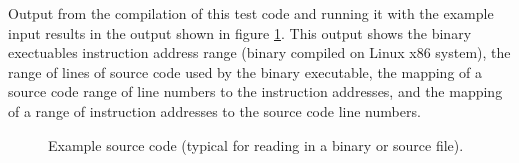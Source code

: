 Output from the compilation of this test code and running it with the example input
results in the output shown in figure \ref{Tutorial:dwarfInstructionAddressToSourceLineExampleOutput}.
This output shows the binary exectuables instruction address range (binary compiled on
Linux x86 system), the range of lines of source code used by the binary executable,
the mapping of a source code range of line numbers to the instruction addresses,
and the mapping of a range of instruction addresses to the source code line numbers.


\begin{figure}[!h]
{\indent
{\mySmallFontSize

\begin{latexonly}
   
\end{latexonly}

\begin{htmlonly}
   
\end{htmlonly}

}
}
\caption{Example source code (typical for reading in a binary or source file).}
\label{Tutorial:dwarfInstructionAddressToSourceLineExampleOutput}
\end{figure}






